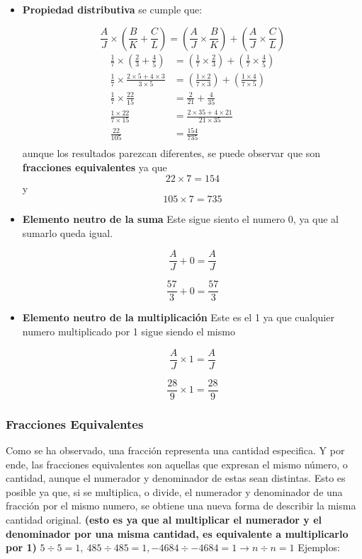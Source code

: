 \documentclass[12pt]{article}
\begin{document}
\begin{itemize}
    \item \textbf{Propiedad distributiva} se cumple que:

        $$\frac{A}{J}\times\left(\frac{B}{K}+\frac{C}{L}\right)=\left(\frac{A}{J}\times\frac{B}{K}\right)+\left(\frac{A}{J}\times\frac{C}{L}\right) $$
        \begin{align*}
            \frac{1}{7}\times\left(\frac{2}{3}+\frac{4}{5}\right)&=\left(\frac{1}{7}\times\frac{2}{3}\right)+\left(\frac{1}{7}\times\frac{4}{5}\right)\\
            \frac{1}{7} \times \frac{2\times5+4\times3}{3\times5} &= \left(\frac{1\times2}{7\times3} \right)+\left(\frac{1\times4}{7\times5} \right) \\
            \frac{1}{7} \times  \frac{22}{15} &= \frac{2}{21} + \frac{4}{35} \\
            \frac{1\times22}{7\times15} &= \frac{2\times35+4\times21}{21\times35} \\
            \frac{22}{105} &= \frac{154}{735} \\
        \end{align*}
        aunque los resultados parezcan diferentes, se puede observar que son
        \textbf{fracciones equivalentes} ya que $$22\times7=154$$ y $$105\times7=735$$

    \item \textbf{Elemento neutro de la suma} Este sigue siento el numero 0, ya
        que al sumarlo queda igual.

        $$\frac{A}{J} + 0 = \frac{A}{J}$$

        $$\frac{57}{3} + 0 = \frac{57}{3}$$


    \item \textbf{Elemento neutro de la multiplicación} Este es el 1 ya que cualquier
        numero multiplicado por 1 sigue siendo el mismo

        $$\frac{A}{J} \times 1 = \frac{A}{J}$$

        $$\frac{28}{9} \times 1 = \frac{28}{9}$$

\end{itemize}


\subsubsection*{Fracciones Equivalentes}
    Como se ha observado, una fracción representa una cantidad especifica.
    Y por ende, las fracciones equivalentes son aquellas que expresan el mismo
    número, o cantidad, aunque el numerador y denominador de estas sean distintas.
    Esto es posible ya que, si se multiplica, o divide, el numerador y denominador de una
    fracción por el mismo numero, se obtiene una nueva forma de describir la
    misma cantidad original. \textbf{(esto es ya que al multiplicar el numerador y el
    denominador por una misma cantidad, es equivalente a multiplicarlo por 1)}
    $5\div5 = 1,\ 485\div485 = 1, -4684\div-4684 = 1 \rightarrow n\div n=1$
    Ejemplos:
\end{document}
